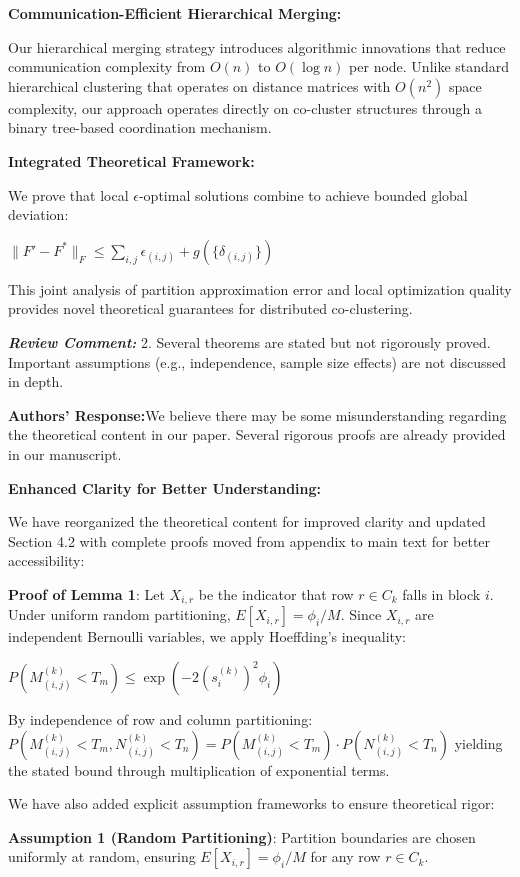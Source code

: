 \documentclass{ar2rc}
\renewcommand{\RC}[1]{\textbf{\textit{Review Comment:}} #1}
\renewcommand{\AR}{\textbf{Authors' Response:}}
\begin{document}
\textbf{Communication-Efficient Hierarchical Merging:}

Our hierarchical merging strategy introduces algorithmic innovations that reduce communication complexity from $O(n)$ to $O(\log n)$ per node. Unlike standard hierarchical clustering that operates on distance matrices with $O(n^2)$ space complexity, our approach operates directly on co-cluster structures through a binary tree-based coordination mechanism.

\textbf{Integrated Theoretical Framework:}

We prove that local $\epsilon$-optimal solutions combine to achieve bounded global deviation:

$\|F' - F^*\|_F \leq \sum_{i,j} \epsilon_{(i,j)} + g(\{\delta_{(i,j)}\})$

This joint analysis of partition approximation error and local optimization quality provides novel theoretical guarantees for distributed co-clustering.

\RC{2. Several theorems are stated but not rigorously proved. Important assumptions (e.g., independence, sample size effects) are not discussed in depth.}

\AR We believe there may be some misunderstanding regarding the theoretical content in our paper. Several rigorous proofs are already provided in our manuscript.

\textbf{Enhanced Clarity for Better Understanding:}

We have reorganized the theoretical content for improved clarity and updated Section 4.2 with complete proofs moved from appendix to main text for better accessibility:

\textbf{Proof of Lemma 1}: Let $X_{i,r}$ be the indicator that row $r \in C_k$ falls in block $i$. Under uniform random partitioning, $E[X_{i,r}] = \phi_i/M$. Since $X_{i,r}$ are independent Bernoulli variables, we apply Hoeffding's inequality:

$P(M_{(i,j)}^{(k)} < T_m) \leq \exp\left(-2(s_i^{(k)})^2 \phi_i\right)$

By independence of row and column partitioning:
$P(M_{(i,j)}^{(k)} < T_m, N_{(i,j)}^{(k)} < T_n) = P(M_{(i,j)}^{(k)} < T_m) \cdot P(N_{(i,j)}^{(k)} < T_n)$
yielding the stated bound through multiplication of exponential terms.

We have also added explicit assumption frameworks to ensure theoretical rigor:

\textbf{Assumption 1 (Random Partitioning)}: Partition boundaries are chosen uniformly at random, ensuring $E[X_{i,r}] = \phi_i/M$ for any row $r \in C_k$.
\end{document}
